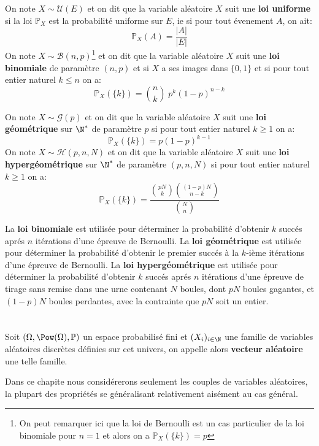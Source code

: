 On note \(X \sim \mathcal{U}(E)\) et on dit que la variable aléatoire \(X\) suit une \textbf{loi uniforme} si la loi \(\mathbb{P}_X\) est la probabilité uniforme sur \(E\), ie si pour tout évenement \(A\), on ait:
\[
   \mathbb{P}_X(A) = \frac{|A|}{|E|}  
\]
On note \(X \sim \mathcal{B}(n, p)\)\footnote[2]{On peut remarquer ici que la loi de Bernoulli est un cas particulier de la loi binomiale pour \(n = 1\) et alors on a \(\mathbb{P}_X(\{k\}) = p\)} et on dit que la variable aléatoire \(X\) suit une \textbf{loi binomiale} de paramètre \((n, p)\) et  si \(X\) a ses images dans \(\{0, 1\}\) et si pour tout entier naturel \(k \leq n\) on a:
\[
   \mathbb{P}_X(\{k\}) = \binom{n}{k} \; p^k(1-p)^{n-k}
\]

On note \(X \sim \mathcal{G}(p)\) et on dit que la variable aléatoire \(X\) suit une \textbf{loi géométrique} sur \(\N^*\) de paramètre \(p\) si pour tout entier naturel \(k \geq 1\) on a:
\[
   \mathbb{P}_X(\{k\}) = p(1 - p)^{k - 1}
\]
On note \(X \sim \mathcal{H}(p, n, N)\) et on dit que la variable aléatoire \(X\) suit une \textbf{loi hypergéométrique} sur \(\N^*\) de paramètre \((p, n, N)\) si pour tout entier naturel \(k \geq 1\) on a:
\[
   \mathbb{P}_X(\{k\}) = \frac{\binom{pN}{k}\binom{(1-p)N}{n - k}}{\binom{N}{n}}
\]

La \textbf{loi binomiale} est utilisée pour déterminer la probabilité d'obtenir \(k\) succés aprés \(n\) itérations d'une épreuve de Bernoulli. \+
La \textbf{loi géométrique} est utilisée pour déterminer la probabilité d'obtenir le premier succés à la \(k\)-ième itérations d'une épreuve de Bernoulli.\+
La \textbf{loi hypergéométrique} est utilisée pour déterminer la probabilité d'obtenir \(k\) succés aprés \(n\) itérations d'une épreuve de tirage sans remise dans une urne contenant \(N\) boules, dont \(pN\) boules gagantes, et \((1-p)N\) boules perdantes, avec la contrainte que \(pN\) soit un entier.\+

\chapter*{} %

Soit \((\Omega, \Pow(\Omega), \mathbb{P})\) un espace probabilisé fini et \((X_i)_{i \in \N}\) une famille de variables aléatoires discrètes définies sur cet univers, on appelle alors \textbf{vecteur aléatoire} une telle famille.\< 

Dans ce chapite nous considérerons seulement les couples de variables aléatoires, la plupart des propriétés se généralisant relativement aisément au cas général.

